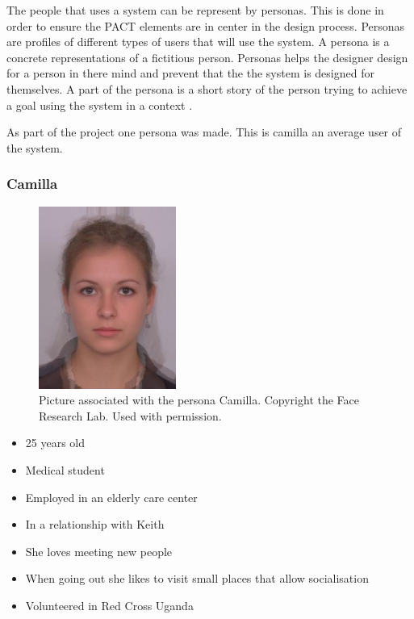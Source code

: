 The people that uses a system can be represent by personas. This is done in order to ensure the PACT elements are in center in the design process. Personas are profiles of different types of users that will use the system. A persona is a concrete representations of a fictitious person. Personas helps the designer design for a person in there mind and prevent that the the system is designed for themselves. A part of the persona is a short story of the person trying to achieve a goal using the system in a context \cite{benyon2013designing}.

As part of the project one persona was made. This is camilla an average user of the system.

\subsubsection{Camilla}
\begin{figure} [h]
  \centering
  \includegraphics[width=0.4\textwidth]{Images/average.jpg}
  \caption{Picture associated with the persona Camilla. Copyright the Face Research Lab. Used with permission.}
  \label{fig:camilla}
\end{figure}
\begin{itemize}
\item 25 years old
\item Medical student
\item Employed in an elderly care center
\item In a relationship with Keith
\item She loves meeting new people
\item When going out she likes to visit small places that allow socialisation
\item Volunteered in Red Cross Uganda
\end{itemize}

